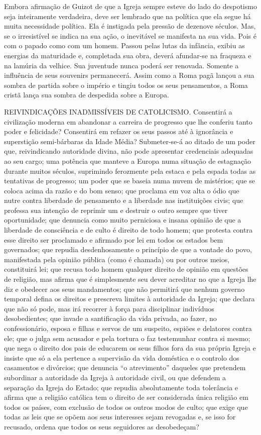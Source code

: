\documentclass[11pt,a5paper,twoside,openany]{book}
\begin{document}
Embora afirmação de Guizot de que a Igreja sempre esteve do lado do despotismo seja inteiramente verdadeira, deve ser lembrado que na política que ela segue há muita necessidade política. Ela é instigada pela pressão de dezenove séculos. Mas, se o irresistível se indica na sua ação, o inevitável se manifesta na sua vida. Pois é com o papado como com um homem. Passou pelas lutas da infância, exibiu as energias da maturidade e, completada sua obra, deverá afundar-se na fraqueza e na lamúria da velhice. Sua juventude nunca poderá ser renovada. Somente a influência de seus souvenirs permanecerá. Assim como a Roma pagã lançou a sua sombra de partida sobre o império e tingiu todos os seus pensamentos, a Roma cristã lança sua sombra de despedida sobre a Europa.

REIVINDICAÇÕES INADMISSÍVEIS DE CATOLICISMO. Consentirá a civilização moderna em abandonar a carreira de progresso que lhe conferiu tanto poder e felicidade? Consentirá em refazer os seus passos até à ignorância e superstição semi-bárbaras da Idade Média? Submeter-se-á ao ditado de um poder que, reivindicando autoridade divina, não pode apresentar credenciais adequadas ao seu cargo; uma potência que manteve a Europa numa situação de estagnação durante muitos séculos, suprimindo ferozmente pela estaca e pela espada todas as tentativas de progresso; um poder que se baseia numa nuvem de mistérios; que se coloca acima da razão e do bom senso; que proclama em voz alta o ódio que nutre contra liberdade de pensamento e a liberdade nas instituições civis; que professa sua intenção de reprimir um e destruir o outro sempre que tiver oportunidade; que denuncia como muito perniciosa e insana opinião de que a liberdade de consciência e de culto é direito de todo homem; que protesta contra esse direito ser proclamado e afirmado por lei em todos os estados bem governados; que repudia desdenhosamente o princípio de que a vontade do povo, manifestada pela opinião pública (como é chamada) ou por outros meios, constituirá lei; que recusa todo homem qualquer direito de opinião em questões de religião, mas afirma que é simplesmente seu dever acreditar no que a Igreja lhe diz e obedecer aos seus mandamentos; que não permitirá que nenhum governo temporal defina os direitos e prescreva limites à autoridade da Igreja; que declara que não só pode, mas irá recorrer à força para disciplinar indivíduos desobedientes; que invade a santificação da vida privada, ao fazer, no confessionário, esposa e filhas e servos de um suspeito, espiões e delatores contra ele; que o julga sem acusador e pela tortura o faz testemunhar contra si mesmo; que nega o direito dos pais de educarem os seus filhos fora da sua própria Igreja e insiste que só a ela pertence a supervisão da vida doméstica e o controlo dos casamentos e divórcios; que denuncia “o atrevimento” daqueles que pretendem subordinar a autoridade da Igreja à autoridade civil, ou que defendem a separação da Igreja do Estado; que repudia absolutamente toda tolerância e afirma que a religião católica tem o direito de ser considerada única religião em todos os países, com exclusão de todos os outros modos de culto; que exige que todas as leis que se opõem aos seus interesses sejam revogadas e, se isso for recusado, ordena que todos os seus seguidores as desobedeçam?
\end{document}
